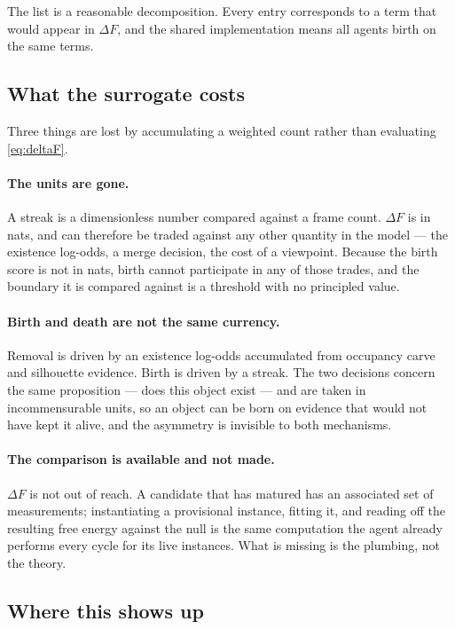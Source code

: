 \documentclass[11pt,a4paper]{report}
\begin{document}
\noindent
The list is a reasonable decomposition. Every entry corresponds to a term that would appear in
$\Delta F$, and the shared implementation means all agents birth on the same terms.

\subsection{What the surrogate costs}

Three things are lost by accumulating a weighted count rather than evaluating \eqref{eq:deltaF}.

\paragraph{The units are gone.} A streak is a dimensionless number compared against a frame count.
$\Delta F$ is in nats, and can therefore be traded against any other quantity in the model --- the
existence log-odds, a merge decision, the cost of a viewpoint. Because the birth score is not in
nats, birth cannot participate in any of those trades, and the boundary it is compared against is
a threshold with no principled value.

\paragraph{Birth and death are not the same currency.} Removal is driven by an existence log-odds
accumulated from occupancy carve and silhouette evidence. Birth is driven by a streak. The two
decisions concern the same proposition --- does this object exist --- and are taken in
incommensurable units, so an object can be born on evidence that would not have kept it alive, and
the asymmetry is invisible to both mechanisms.

\paragraph{The comparison is available and not made.} $\Delta F$ is not out of reach. A candidate
that has matured has an associated set of measurements; instantiating a provisional instance,
fitting it, and reading off the resulting free energy against the null is the same computation the
agent already performs every cycle for its live instances. What is missing is the plumbing, not
the theory.

\subsection{Where this shows up}
\end{document}
